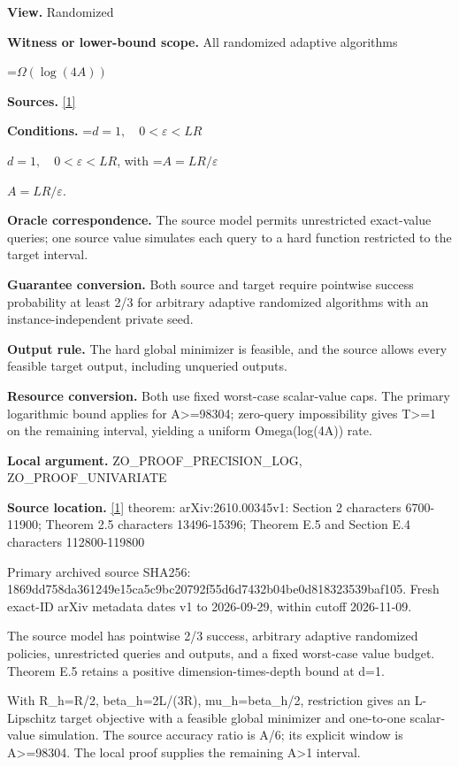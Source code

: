 \documentclass[10pt,a4paper]{article}
\newcommand{\AtlasMath}[1]{\par\begingroup\centering\setbox0=\hbox{$\displaystyle #1$}\ifdim\wd0>1.4\linewidth\typeout{ATLAS WIDE FORMULA: \the\wd0}\fi\ifdim\wd0>\linewidth\resizebox{\linewidth}{!}{\box0}\else\box0\fi\par\endgroup}
\newcommand{\AtlasInlineMath}[1]{\begingroup\setbox0=\hbox{$#1$}\ifdim\wd0>.4\linewidth\endgroup\AtlasMath{#1}\else\endgroup$#1$\fi}
\begin{document}
\textbf{View.} Randomized

\textbf{Witness or lower-bound scope.} All randomized adaptive algorithms

\AtlasMath{\Omega(\log(4A))}
\textbf{Sources.} \href{https://arxiv.org/html/2610.00345v1}{[1]}

\textbf{Conditions.} \AtlasInlineMath{d=1,\quad 0<\varepsilon<LR}, with \AtlasInlineMath{A=LR/\varepsilon}.

\textbf{Oracle correspondence.} The source model permits unrestricted exact-value queries; one source value simulates each query to a hard function restricted to the target interval.

\textbf{Guarantee conversion.} Both source and target require pointwise success probability at least 2/3 for arbitrary adaptive randomized algorithms with an instance-independent private seed.

\textbf{Output rule.} The hard global minimizer is feasible, and the source allows every feasible target output, including unqueried outputs.

\textbf{Resource conversion.} Both use fixed worst-case scalar-value caps. The primary logarithmic bound applies for A>=98304; zero-query impossibility gives T>=1 on the remaining interval, yielding a uniform Omega(log(4A)) rate.

\textbf{Local argument.} ZO\_\allowbreak{}PROOF\_\allowbreak{}PRECISION\_\allowbreak{}LOG, ZO\_\allowbreak{}PROOF\_\allowbreak{}UNIVARIATE

\textbf{Source location.} \href{https://arxiv.org/html/2610.00345v1}{[1]} theorem: arXiv:2610.00345v1: Section 2 characters 6700-11900; Theorem 2.5 characters 13496-15396; Theorem E.5 and Section E.4 characters 112800-119800

Primary archived source SHA256: 1869dd758da361249e15ca5c9bc20792f55d6d7432b04be0d818323539baf105. Fresh exact-ID arXiv metadata dates v1 to 2026-09-29, within cutoff 2026-11-09.

The source model has pointwise 2/3 success, arbitrary adaptive randomized policies, unrestricted queries and outputs, and a fixed worst-case value budget. Theorem E.5 retains a positive dimension-times-depth bound at d=1.

With R\_\allowbreak{}h=R/2, beta\_\allowbreak{}h=2L/(3R), mu\_\allowbreak{}h=beta\_\allowbreak{}h/2, restriction gives an L-Lipschitz target objective with a feasible global minimizer and one-to-one scalar-value simulation. The source accuracy ratio is A/6; its explicit window is A>=98304. The local proof supplies the remaining A>1 interval.
\end{document}
